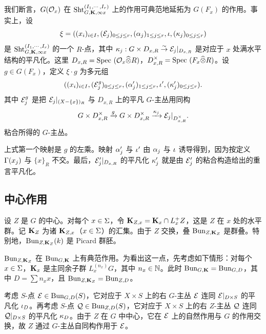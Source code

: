 我们断言，$G(\mathcal{O}_{x})$ 在 $\textup{Sht}^{(I_{1},\cdots, I_{r})}_{G, \mathbf{K},\infty x}$ 上的作用可典范地延拓为 $G(F_{x})$ 的作用。事实上，设
\begin{equation*}
\xi=((x_{i})_{i\in I}, (\mathcal{E}_{j})_{0\le j\le r}, (\alpha_{j})_{1\le j\le r}, \iota, (\kappa_{j})_{0\le j\le r})
\end{equation*}
是 $\textup{Sht}^{(I_{1},\cdots, I_{r})}_{G,\mathbf{K},\infty x}$ 的一个 $R$-点，其中 $\kappa_{j}: G\times D_{x, R}\stackrel{\sim}{\to} \mathcal{E}_{j}|_{D_{x,R}}$ 是对应于 $x$ 处满水平结构的平凡化。这里 $D_{x,R}=\textup{Spec}\ (\mathcal{O}_{x}\widehat{\otimes} R)$，$D_{x,R}^{\times}=\textup{Spec}\ (F_{x}\widehat{\otimes} R)$。设 $g\in G(F_{x})$，定义 $\xi\cdot g$ 为多元组
\begin{equation*}
((x_{i})_{i\in I}, (\mathcal{E}^{g}_{j})_{0\le j\le r}, (\alpha'_{j})_{1\le j\le r}, \iota', (\kappa'_{j})_{0\le j\le r}).
\end{equation*}
其中 $\mathcal{E}^{g}_{j}$ 是把 $\mathcal{E}_{j}|_{(X-\{x\})_{R}}$ 与 $D_{x,R}$ 上的平凡 $G$-主丛用同构
\begin{equation*}
G\times D^{\times}_{x, R}\xrightarrow{g} G\times D^{\times}_{x, R} \xrightarrow{\kappa_{j}} \mathcal{E}_{j}|_{D^{\times}_{x,R}}.
\end{equation*}
粘合所得的 $G$-主丛。

上式第一个映射是 $g$ 的左乘。映射 $\alpha'_{j}$ 与 $\iota'$ 由 $\alpha_{j}$ 与 $\iota$ 诱导得到，因为按定义 $\Gamma(x_{j})$ 与 $\{x\}_{R}$ 不交。最后，$\mathcal{E}'_{j}|_{D_{x,R}}$ 的平凡化 $\kappa'_{j}$ 就是由 $\mathcal{E}'_{j}$ 的粘合构造给出的重言平凡化。

\subsection{中心作用}\label{sss:central action}

设 $Z$ 是 $G$ 的中心。对每个 $x\in \Sigma$，令 $\mathbf{K}_{Z,x}=\mathbf{K}_{x}\cap L^{+}_{x}Z$，这是 $Z$ 在 $x$ 处的水平群。记 $\mathbf{K}_{Z}$ 为诸 $\mathbf{K}_{Z,x}$（$x\in \Sigma$）的汇集。由于 $Z$ 交换，叠 $\textup{Bun}_{Z,\mathbf{K}_{Z}}$ 是群叠。特别地，$\textup{Bun}_{Z,\mathbf{K}_{Z}}(k)$ 是 Picard 群胚。

$\textup{Bun}_{Z,\mathbf{K}_{Z}}$ 在 $\textup{Bun}_{G,\mathbf{K}}$ 上有典范作用。为看出这一点，先考虑如下情形：对每个 $x\in \Sigma$，$\mathbf{K}_{x}$ 是主同余子群 $L^{(n_{x})}_{x}G$，其中 $n_{x}\in\mathbb{N}$。此时 $\textup{Bun}_{G,\mathbf{K}}=\textup{Bun}_{G,D}$，其中 $D=\sum n_{x}x$，且 $\textup{Bun}_{Z,\mathbf{K}_{Z}}=\textup{Bun}_{Z,D}$。

考虑 $S$-点 $\mathcal{E}\in\textup{Bun}_{G,D}(S)$，它对应于 $X\times S$ 上的右 $G$-主丛 $\mathcal{E}$ 连同 $\mathcal{E}|_{D\times S}$ 的平凡化 $\iota_{D}$。再考虑 $S$-点 $\mathcal{Q}\in \textup{Bun}_{Z,D}(S)$，它对应于 $X\times S$ 上的右 $Z$-主丛 $\mathcal{Q}$ 连同 $\mathcal{Q}|_{D\times S}$ 的平凡化 $\kappa_{D}$。由于 $Z$ 在 $G$ 中中心，它在 $\mathcal{E}$ 上的自然作用与 $G$ 的作用交换，故 $Z$ 通过 $G$-主丛自同构作用于 $\mathcal{E}$。

